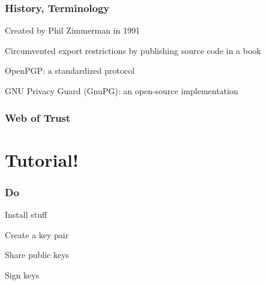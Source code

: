 \documentclass{beamer}
\begin{document}
\begin{frame}
  \frametitle{History, Terminology}

Created by Phil Zimmerman in 1991

Circumvented export restrictions by publishing source code in a book

OpenPGP: a standardized protocol

GNU Privacy Guard (GnuPG): an open-source implementation

\end{frame}

\begin{frame}
  \frametitle{Web of Trust}
\end{frame}

\section{Tutorial!}

\begin{frame}
  \frametitle{Do}

  Install stuff

  Create a key pair

  Share public keys

  Sign keys

\end{frame}
\end{document}
